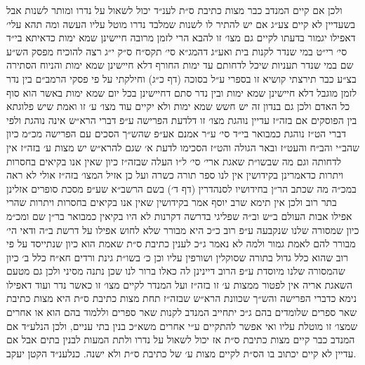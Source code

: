 \documentclass[12pt, openany]{book}
\begin{document}
\begin{multicols}{2}
ולכן אם קיים המנדב כבר מצות כתיבת ס״ת לענ״ד יכול לשאול על נדרו ומותר לשנות אבל בשעדיין לא קיים צע״ג אם יש להתיר לו לשנות שמלבד נדרו מוטל עליו העשה ומה תהא עלי׳ דאפילו יגמור בדעתו לקיים גם מצו׳ זו להבא הרי לזמן מרובה חיישינן שמא ימות כדאיתא בי״ד סי׳ רי״ט במי שנדר לקנות בית ואע״ג דהמג״א סי׳ תקס״ח ס״ק י״ג רצה להוכיח מפסק הש״ע שם במי שנדר תעניות שיכל לדחותם עד ימות החורף דלא חיישינן שמא ימות והניוח הסתירה בצ״ע כבר תירצתי קושיא זו בספרי ע״ל בסוכה (דף כ״ג) וחילקתי על פי פסקי הרמב״ם בין נדר לזמן מוגבל דלא חיישינן שמא ימות ובין נדר סתם דחיישינן בכל יום שמא ימות באשר הוא סוף כל האדם ולכן גם בנדון זה יש חשש שמא ימות ולא יקיים עוד מצו׳ ע׳ זו ואמת שיש פלוגתא בין הפוסקים אם בזה״ז עדיין נוהגת מצו׳ זו דלדעת הפרישה ע״פ דברי הרא״ש אינה נוהגת ולפי דברי הט״ז נוהגת כמבואר בי״ד סי׳ ע״ר אמנם אע״פ שהש״ך הסכים עם הפרישה מכ״מ כיון שהב״י והב״ח והעט״ז ובאר הגולה והט״ז הסכימו לדעת א׳ שגם להרא״ש יש מצות ע׳ בזה״ז אין לדחותה וגם מה שבשו״ת שאגת ארי׳ סי׳ ל״ו העלה שבזה״ז כיון שאין אנו בקיאים בחסרות ויתרות כדאמרינן בקידושין אין לנו ספר תורה כשרה ועל כן אזיל המצו׳ בזה״ז אולי לא ראה במכ״ה מה שכתב הר״ן בחידושיו לסנהדרין (דף ד׳) בשם הרשב״א שע״פ מסכת סופרים אזלינן בתר רוב ולכן אין תימא שרב יוסף אמר בקידושין שאין אנו בקיאים בחסרות ויתרות שהרי אפילו אבות העולם ב״ש וב״ה שפליגי בדרשה דקרנות לא היו בקיאין כמבואר בר״ן שם ומכ״מ כיון שמסורה שלנו שנקבעה ע״פ רוב כ״כ היא מבורר שלא לחוש אפילו על דרשת ב״ה ודאי הי׳ מבורר להם לאמת גמור ולמה לא נאמר ג״כ לענין כתיבת ס״ת שאמת הוא כיון שנתייסד על פי רוב שהוא כלל גדול בתורה שסוקלין ושורפין עליו וכן כ׳ בשו״ת גינת ורדים חא״ח כלל ב׳ כיון שהמסורה שלנו מיוסדת ע״פ הרוב דיינינן לה כאלו ברור לנו שכן נתנה מסיני ולכן גם מטעם השאגת אריה אין לפטור ממצות ע׳ זו בזה״ז ועל המנדר לקיים מצו׳ זו כאשר נדר ועוד דאפילו נימא כדברי הפרישה והש״ך שכוונת הרא״ש שבזה״ז תחת מצות כתיבת ס״ת היא מצות כתיבת שאר ספרים שלומדים בהם ג״כ יתחייב המנדב לקנות שאר ספרים וללמוד בהם הוא או אחרים שמצו׳ זו מוטלת עליו ואי אפשר להתקיים ע״י אחרים משא״כ בנין בתי עניים, ולכן הנלע״ד אם המנדב כבר קיים מצות כתיבת ס״ת אז יכול לשאול על נדרו ולתת המעות לבנין בתים אבל אם עדיין לא קיים יכתוב בו הס״ת לקיים מצות ע׳ של כתיבת ס״ת ולא ישנה. כנלענ״ד הקטן יעקב.\\\vspace{0pt}

\end{multicols}\newpage
\end{document}

